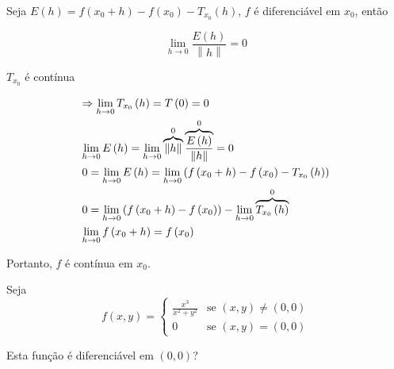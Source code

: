\documentclass{book}
\begin{document}
\begin{dem}
    Seja $E\left( h \right) = f\left( {x_0  + h} \right) - f\left( {x_0 } \right) - T_{x_0} \left( h \right)$, $f$ \'e diferenci\'avel em $x_0$, ent\~ao

\[
    \mathop {\lim }\limits_{h \to 0} \frac{{E\left( h \right)}}{{\left\| h \right\|}} = 0
\]

$T_{x_0}$ \'e cont\'inua

\[
\begin{gathered}
   \Rightarrow \mathop {\lim }\limits_{h \to 0} T_{x_0 } \left( h \right) = T\left( 0 \right) = 0 \hfill \\
  \mathop {\lim }\limits_{h \to 0} E\left( h \right) = \mathop {\lim }\limits_{h \to 0} \overbrace {\left\| h \right\|}^0\overbrace {\frac{{E\left( h \right)}}
{{\left\| h \right\|}}}^0 = 0 \hfill \\
  0 = \mathop {\lim }\limits_{h \to 0} E\left( h \right) = \mathop {\lim }\limits_{h \to 0} \left( {f\left( {x_0  + h} \right) - f\left( {x_0 } \right) - T_{x_0 } \left( h \right)} \right) \hfill \\
  0 = \mathop {\lim }\limits_{h \to 0} \left( {f\left( {x_0  + h} \right) - f\left( {x_0 } \right)} \right) - \mathop {\lim }\limits_{h \to 0} \overbrace {T_{x_0 } \left( h \right)}^0 \hfill \\
  \mathop {\lim }\limits_{h \to 0} f\left( {x_0  + h} \right) = f\left( {x_0 } \right) \hfill \\
\end{gathered}
\]

Portanto, $f$ \'e cont\'inua em $x_0$.
\end{dem}

\begin{ex}
Seja
\begin{equation*}
f(x,y)=\left\{ \begin{array}{cl}\displaystyle
        \frac{{x^3}}{{x^2 + y^2 }} & \textrm{se }\left( {x,y} \right) \ne \left( {0,0} \right)\\
        0 & \textrm{se }\left( {x,y} \right) = \left( {0,0} \right)\end{array}\right.
\end{equation*}

Esta fun\c c\~ao \'e diferenci\'avel em $(0,0)$?
\end{ex}
\end{document}
